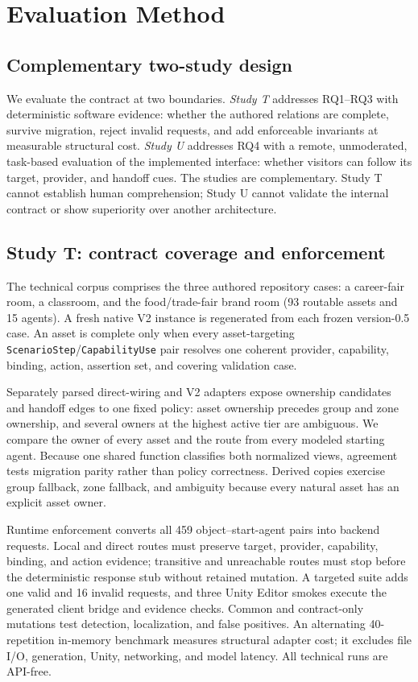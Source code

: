 \section{Evaluation Method}
\label{sec:evaluation}

\subsection{Complementary two-study design}

We evaluate the contract at two boundaries.  \emph{Study T} addresses
RQ1--RQ3 with deterministic software evidence: whether the authored relations
are complete, survive migration, reject invalid requests, and add enforceable
invariants at measurable structural cost.  \emph{Study U} addresses RQ4 with a
remote, unmoderated, task-based evaluation of the implemented interface:
whether visitors can follow its target, provider, and handoff cues.  The studies
are complementary.  Study T cannot establish human comprehension; Study U
cannot validate the internal contract or show superiority over another
architecture.

\subsection{Study T: contract coverage and enforcement}

The technical corpus comprises the three authored repository cases: a
career-fair room, a classroom, and the food/trade-fair brand room (93 routable
assets and 15 agents).  A fresh native V2 instance is regenerated from each
frozen version-0.5 case.  An asset is complete only when every asset-targeting
\texttt{ScenarioStep}/\texttt{CapabilityUse} pair resolves one coherent
provider, capability, binding, action, assertion set, and covering validation
case.

Separately parsed direct-wiring and V2 adapters expose ownership candidates and
handoff edges to one fixed policy: asset ownership precedes group and zone
ownership, and several owners at the highest active tier are ambiguous.  We
compare the owner of every asset and the route from every modeled starting
agent.  Because one shared function classifies both normalized views, agreement
tests migration parity rather than policy correctness.  Derived copies exercise
group fallback, zone fallback, and ambiguity because every natural asset has an
explicit asset owner.

Runtime enforcement converts all 459 object--start-agent pairs into backend
requests.  Local and direct routes must preserve target, provider, capability,
binding, and action evidence; transitive and unreachable routes must stop
before the deterministic response stub without retained mutation.  A targeted
suite adds one valid and 16 invalid requests, and three Unity Editor smokes
execute the generated client bridge and evidence checks.  Common and
contract-only mutations test detection, localization, and false positives.  An
alternating 40-repetition in-memory benchmark measures structural adapter cost;
it excludes file I/O, generation, Unity, networking, and model latency.  All
technical runs are API-free.


